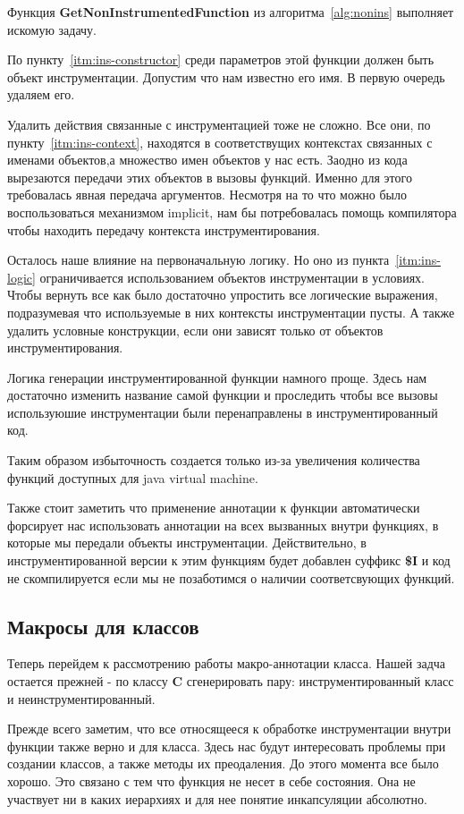 Функция \textbf{GetNonInstrumentedFunction} из алгоритма~\ref{alg:nonins}
выполняет искомую задачу.

По пункту~\ref{itm:ins-constructor} среди параметров этой функции должен быть
объект инструментации.
Допустим что нам известно его имя.
В первую очередь удаляем его.

Удалить действия связанные с инструментацией тоже не сложно.
Все они, по пункту~\ref{itm:ins-context}, находятся в соответствущих контекстах
связанных с именами объектов,а множество имен объектов у нас есть.
Заодно из кода вырезаются передачи этих объектов в вызовы функций.
Именно для этого требовалась явная передача аргументов.
Несмотря на то что можно было воспользоваться механизмом implicit,
нам бы потребовалась помощь компилятора чтобы находить передачу контекста
инструментирования.

Осталось наше влияние на первоначальную логику.
Но оно из пункта~\ref{itm:ins-logic} ограничивается использованием объектов
инструментации в условиях.
Чтобы вернуть все как было достаточно упростить все логические выражения,
подразумевая что используемые в них контексты инструментации пусты.
А также удалить условные конструкции, если они зависят только от объектов
инструментирования.

Логика генерации инструментированной функции намного проще.
Здесь нам достаточно изменить название самой функции и проследить чтобы все
вызовы используюшие инструментации были перенаправлены в инструментированный
код.

Таким образом избыточность создается только из-за увеличения количества функций
доступных для java virtual machine.

Также стоит заметить что применение аннотации к функции автоматически форсирует
нас использовать аннотации на всех вызванных внутри функциях, в которые мы передали
объекты инструментации.
Действительно, в инструментированной версии к этим функциям будет добавлен
суффикс \textbf{\$I} и код не скомпилируется если мы не позаботимся о наличии
соответсвующих функций.

\subsection{Макросы для классов}
\label{sec:macroClass}
Теперь перейдем к рассмотрению работы макро-аннотации класса.
Нашей задча остается прежней - по классу \textbf{C} сгенерировать пару:
инструментированный класс и неинструментированный.

Прежде всего заметим, что все относящееся к обработке инструментации внутри
функции также верно и для класса.
Здесь нас будут интересовать проблемы при создании классов, а также методы
их преодаления.
До этого момента все было хорошо.
Это связано с тем что функция не несет в себе состояния.
Она не участвует ни в каких иерархиях и для нее понятие инкапсуляции абсолютно.

